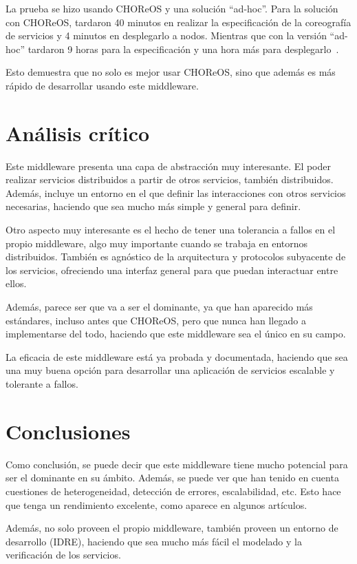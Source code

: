 \documentclass[runningheads]{llncs}
\begin{document}
La prueba se hizo usando CHOReOS y una solución ``ad-hoc''. Para la solución con CHOReOS, tardaron 40 minutos en realizar la especificación de la coreografía de servicios y 4 minutos en desplegarlo a nodos. Mientras que con la versión ``ad-hoc'' tardaron 9 horas para la especificación y una hora más para desplegarlo~\cite{a_20}.

Esto demuestra que no solo es mejor usar CHOReOS, sino que además es más rápido de desarrollar usando este middleware.

\section{Análisis crítico}
Este middleware presenta una capa de abstracción muy interesante. El poder realizar servicios distribuidos a partir de otros servicios, también distribuidos. Además, incluye un entorno en el que definir las interacciones con otros servicios necesarias, haciendo que sea mucho más simple y general para definir.

Otro aspecto muy interesante es el hecho de tener una tolerancia a fallos en el propio middleware, algo muy importante cuando se trabaja en entornos distribuidos. También es agnóstico de la arquitectura y protocolos subyacente de los servicios, ofreciendo una interfaz general para que puedan interactuar entre ellos.

Además, parece ser que va a ser el dominante, ya que han aparecido más estándares, incluso antes que CHOReOS, pero que nunca han llegado a implementarse del todo, haciendo que este middleware sea el único en su campo.

La eficacia de este middleware está ya probada y documentada, haciendo que sea una muy buena opción para desarrollar una aplicación de servicios escalable y tolerante a fallos.

\section{Conclusiones}
Como conclusión, se puede decir que este middleware tiene mucho potencial para ser el dominante en su ámbito. Además, se puede ver que han tenido en cuenta cuestiones de heterogeneidad, detección de errores, escalabilidad, etc. Esto hace que tenga un rendimiento excelente, como aparece en algunos artículos.

Además, no solo proveen el propio middleware, también proveen un entorno de desarrollo (IDRE), haciendo que sea mucho más fácil el modelado y la verificación de los servicios.
\end{document}
